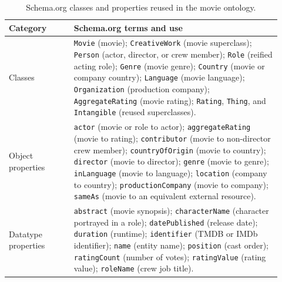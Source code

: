 \begin{table}[t]
    \centering
    \caption{Schema.org classes and properties reused in the movie ontology.}
    \label{tab:schema-vocabulary}
    \small
    \begin{tabular}{p{0.22\linewidth}p{0.70\linewidth}}
        \toprule
        \textbf{Category} & \textbf{Schema.org terms and use} \\
        \midrule
        Classes &
        \texttt{Movie} (movie); \texttt{CreativeWork} (movie superclass);
        \texttt{Person} (actor, director, or crew member);
        \texttt{Role} (reified acting role); \texttt{Genre} (movie genre);
        \texttt{Country} (movie or company country);
        \texttt{Language} (movie language);
        \texttt{Organization} (production company);
        \texttt{AggregateRating} (movie rating);
        \texttt{Rating}, \texttt{Thing}, and \texttt{Intangible}
        (reused superclasses). \\
        \midrule
        Object properties &
        \texttt{actor} (movie or role to actor);
        \texttt{aggregateRating} (movie to rating);
        \texttt{contributor} (movie to non-director crew member);
        \texttt{countryOfOrigin} (movie to country);
        \texttt{director} (movie to director);
        \texttt{genre} (movie to genre);
        \texttt{inLanguage} (movie to language);
        \texttt{location} (company to country);
        \texttt{productionCompany} (movie to company);
        \texttt{sameAs} (movie to an equivalent external resource). \\
        \midrule
        Datatype properties &
        \texttt{abstract} (movie synopsis);
        \texttt{characterName} (character portrayed in a role);
        \texttt{datePublished} (release date);
        \texttt{duration} (runtime);
        \texttt{identifier} (TMDB or IMDb identifier);
        \texttt{name} (entity name);
        \texttt{position} (cast order);
        \texttt{ratingCount} (number of votes);
        \texttt{ratingValue} (rating value);
        \texttt{roleName} (crew job title). \\
        \bottomrule
    \end{tabular}
\end{table}